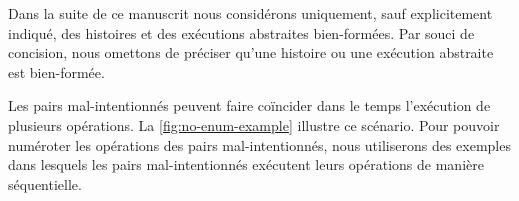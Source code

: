 \begin{remark}
Dans la suite de ce manuscrit nous considérons uniquement, sauf explicitement indiqué, des histoires et des exécutions abstraites bien-formées.
Par souci de concision, nous omettons de préciser qu'une histoire ou une exécution abstraite est bien-formée.
\end{remark}

Les pairs mal-intentionnés peuvent faire coïncider dans le temps l'exécution de plusieurs opérations.
La \autoref{fig:no-enum-example} illustre ce scénario.
Pour pouvoir numéroter les opérations des pairs mal-intentionnés, nous utiliserons des exemples dans lesquels les pairs mal-intentionnés exécutent leurs opérations de manière séquentielle.

